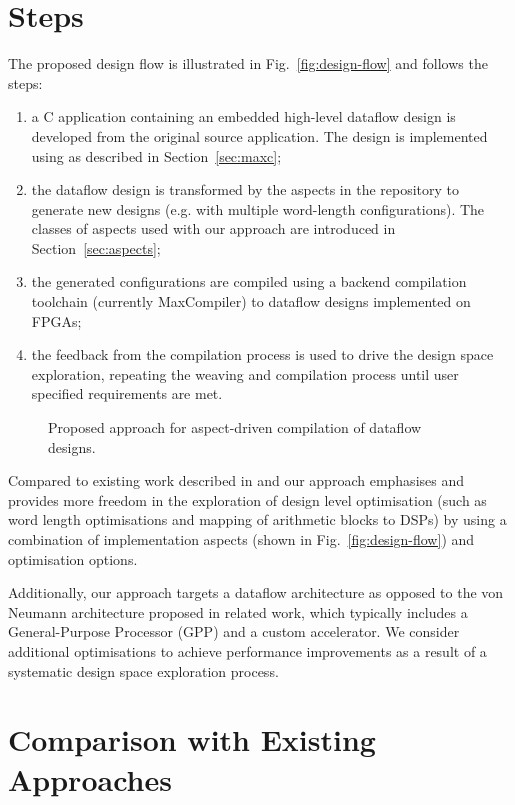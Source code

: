\section{Steps}
The proposed design flow is illustrated in Fig.~\ref{fig:design-flow}
and follows the steps:
\begin{enumerate}
\item a C application containing an embedded high-level dataflow
  design is developed from the original source application. The design
  is implemented using \FAST{} as described in Section~\ref{sec:maxc};
\item the dataflow design is transformed by the aspects in the
  repository to generate new designs (e.g. with multiple word-length
  configurations). The classes of aspects used with our approach are
  introduced in Section~\ref{sec:aspects};
\item the generated configurations are compiled using a backend
  compilation toolchain (currently MaxCompiler) to dataflow designs
  implemented on FPGAs;
\item the feedback from the compilation process is used to drive the
  design space exploration, repeating the weaving and compilation
  process until user specified requirements are met.
\end{enumerate}


\begin{figure}[!ht]
  \centering
  \def\svgwidth{\textwidth}
  
  \caption{Proposed approach for aspect-driven compilation of dataflow
   designs.}
  \label{fig:reconfig-design-flow}
\end{figure}

Compared to existing work described in
\cite{Cardoso:Teixeira:Alves:Nobre:Diniz:Cutinho:Luk:2012} and
\cite{cardoso2011new} our approach emphasises and provides more
freedom in the exploration of design level optimisation (such as word
length optimisations and mapping of arithmetic blocks to DSPs) by
using a combination of implementation aspects (shown in
Fig.~\ref{fig:design-flow}) and \FAST{} optimisation options.

Additionally, our approach targets a dataflow architecture as opposed
to the von Neumann architecture proposed in related work, which
typically includes a General-Purpose Processor (GPP) and a custom
accelerator. We consider additional optimisations to achieve
performance improvements as a result of a systematic design space
exploration process.

\section{Comparison with Existing Approaches}

